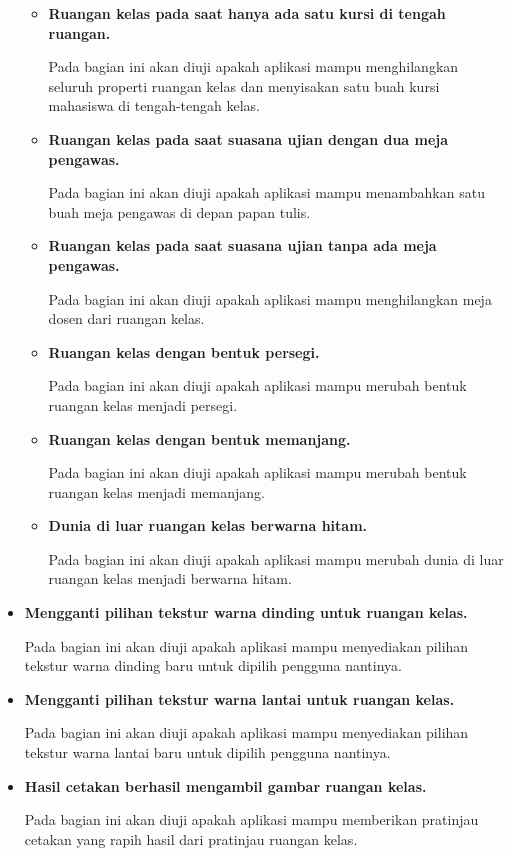 \begin{itemize}
\begin{itemize}
			\item {\bf Ruangan kelas pada saat hanya ada satu kursi di tengah ruangan.}
			
			Pada bagian ini akan diuji apakah aplikasi mampu menghilangkan seluruh properti ruangan kelas dan menyisakan satu buah kursi mahasiswa di tengah-tengah kelas.
			
			\item {\bf Ruangan kelas pada saat suasana ujian dengan dua meja pengawas.}
			
			Pada bagian ini akan diuji apakah aplikasi mampu menambahkan satu buah meja pengawas di depan papan tulis.
			
			\item {\bf Ruangan kelas pada saat suasana ujian tanpa ada meja pengawas.}
			
			Pada bagian ini akan diuji apakah aplikasi mampu menghilangkan meja dosen dari ruangan kelas.
			
			\item {\bf Ruangan kelas dengan bentuk persegi.}
			
			Pada bagian ini akan diuji apakah aplikasi mampu merubah bentuk ruangan kelas menjadi persegi.
			
			\item {\bf Ruangan kelas dengan bentuk memanjang.}
			
			Pada bagian ini akan diuji apakah aplikasi mampu merubah bentuk ruangan kelas menjadi memanjang.
			
			\item {\bf Dunia di luar ruangan kelas berwarna hitam.}
			
			Pada bagian ini akan diuji apakah aplikasi mampu merubah dunia di luar ruangan kelas menjadi berwarna hitam.
			
		\end{itemize}
	\item {\bf Mengganti pilihan tekstur warna dinding untuk ruangan kelas.}
	
	Pada bagian ini akan diuji apakah aplikasi mampu menyediakan pilihan tekstur warna dinding baru untuk dipilih pengguna nantinya.
	
	\item {\bf Mengganti pilihan tekstur warna lantai untuk ruangan kelas.}
	
	Pada bagian ini akan diuji apakah aplikasi mampu menyediakan pilihan tekstur warna lantai baru untuk dipilih pengguna nantinya.
	
	\item {\bf Hasil cetakan berhasil mengambil gambar ruangan kelas.}
	
	Pada bagian ini akan diuji apakah aplikasi mampu memberikan pratinjau cetakan yang rapih hasil dari pratinjau ruangan kelas.
\end{itemize}



















